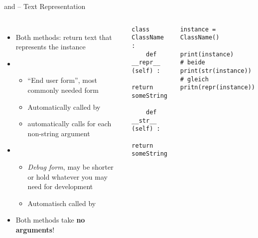 
\begin{frame}[fragile]{ and  -- Text Representation}
%
\begin{columns}[T]
%
\begin{itemize}
\item Both methods: return text that represents the instance
\item {}
	\begin{itemize}
	\item \enquote{End user form}, most commonly needed form
	\item Automatically called by 
	\item {} automatically calls  for each non-string argument
	\end{itemize}
\item {}
	\begin{itemize}
	\item \emph{Debug form}, may be shorter or hold whatever you may need for development
	\item Automatisch called by 
	\end{itemize}
\item Both methods take \textbf{no arguments}!
\end{itemize}
%
\begin{codebox}
\begin{verbatim}
class ClassName :
    def __repr__ (self) :
        return someString
    
    def __str__ (self) :
        return someString
\end{verbatim}
\end{codebox}
%
\begin{codebox}
\begin{verbatim}
instance = ClassName()

print(instance)         # beide
print(str(instance))    # gleich
pritn(repr(instance))
\end{verbatim}
\end{codebox}
\end{columns}
%
\end{frame}

